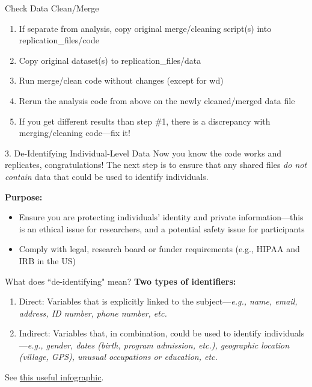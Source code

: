 \documentclass[12pt, compress]{beamer} %
\renewcommand{\texttt}[2][ceruleanblue]{\textcolor{#1}{\ttfamily #2}}%
\let\noteitem\item %
\renewcommand{\item}{ 
	\noteitem\vspace{\fill}
	}
\begin{document}
		\begin{frame}{Check Data Clean/Merge}
			\begin{enumerate}
				\item If separate from analysis, copy original merge/cleaning script(s) into \texttt{replication\_files/code}
				\item Copy original dataset(s) to \texttt{replication\_files/data}
				\item Run merge/clean code without changes (except for wd)
				\item Rerun the analysis code from above on the newly cleaned/merged data file
				\item If you get different results than step \#1, there is a discrepancy with  merging/cleaning code---fix it!
			\end{enumerate}
		\end{frame}
		
	\begin{frame}{3. De-Identifying Individual-Level Data}
		Now you know the code works and replicates, congratulations! The next step is to ensure that any shared files \textit{do not contain} data that could be used to identify individuals. 
		
		\bigskip
		
		\textbf{Purpose:} 
		\begin{itemize}
			\item Ensure you are \textcolor{burntorange}{protecting individuals' identity and private information}---this is an ethical issue for researchers, and a potential safety issue for participants
			\item Comply with legal, research board or funder requirements (e.g., HIPAA and IRB in the US) 
		\end{itemize}
		
	\end{frame}

	\begin{frame}{What does ``de-identifying" mean?}
		\textbf{Two types of identifiers:}
		
		\begin{enumerate}
			\item \textcolor{burntorange}{Direct:} Variables that is explicitly linked to the subject---\textit{e.g., name, email, address, ID number, phone number, etc.}
			\item \textcolor{burntorange}{Indirect:} Variables that, in combination, could be used to identify individuals---\textit{e.g., gender, dates (birth, program admission, etc.), geographic location (village, GPS), unusual occupations or education, etc.}
		\end{enumerate}
		
		\bigskip
		
		See \href{https://fpf.org/wp-content/uploads/2016/04/FPF_Visual-Guide-to-Practical-Data-DeID.pdf}{this useful infographic}.
	\end{frame}
\end{document}
